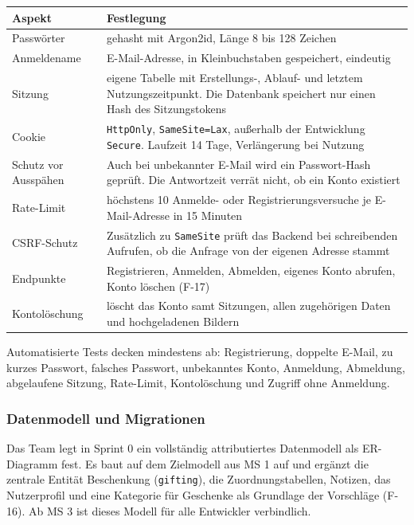 \documentclass[11pt,a4paper]{article}
\begin{document}
\begin{tabularx}{\linewidth}{@{}>{\hsize=0.53\hsize\RaggedRight\arraybackslash}X >{\hsize=1.47\hsize\RaggedRight\arraybackslash}X@{}}
\toprule
\textbf{Aspekt} & \textbf{Festlegung} \\
\midrule
\endhead
Passwörter & gehasht mit Argon2id, Länge 8 bis 128 Zeichen \\
Anmeldename & E-Mail-Adresse, in Kleinbuchstaben gespeichert, eindeutig \\
Sitzung & eigene Tabelle mit Erstellungs-, Ablauf- und letztem Nutzungszeitpunkt. Die Datenbank speichert nur einen Hash des Sitzungstokens \\
Cookie & \texttt{HttpOnly}, \texttt{SameSite=Lax}, außerhalb der Entwicklung \texttt{Secure}. Laufzeit 14 Tage, Verlängerung bei Nutzung \\
Schutz vor Ausspähen & Auch bei unbekannter E-Mail wird ein Passwort-Hash geprüft. Die Antwortzeit verrät nicht, ob ein Konto existiert \\
Rate-Limit & höchstens 10 Anmelde- oder Registrierungsversuche je E-Mail-Adresse in 15 Minuten \\
CSRF-Schutz & Zusätzlich zu \texttt{SameSite} prüft das Backend bei schreibenden Aufrufen, ob die Anfrage von der eigenen Adresse stammt \\
Endpunkte & Registrieren, Anmelden, Abmelden, eigenes Konto abrufen, Konto löschen (F-17) \\
Kontolöschung & löscht das Konto samt Sitzungen, allen zugehörigen Daten und hochgeladenen Bildern \\
\bottomrule
\end{tabularx}

Automatisierte Tests decken mindestens ab: Registrierung, doppelte E-Mail, zu kurzes Passwort, falsches Passwort, unbekanntes Konto, Anmeldung, Abmeldung, abgelaufene Sitzung, Rate-Limit, Kontolöschung und Zugriff ohne Anmeldung.

\subsubsection{Datenmodell und Migrationen}

Das Team legt in Sprint 0 ein vollständig attributiertes Datenmodell als ER-Diagramm fest. Es baut auf dem Zielmodell aus MS 1 auf und ergänzt die zentrale Entität Beschenkung (\texttt{gifting}), die Zuordnungstabellen, Notizen, das Nutzerprofil und eine Kategorie für Geschenke als Grundlage der Vorschläge (F-16). Ab MS 3 ist dieses Modell für alle Entwickler verbindlich.
\end{document}
